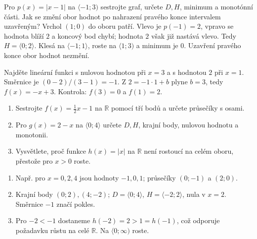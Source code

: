 \documentclass[11pt,a4paper]{article}
\begin{document}
\begin{zadaniReseniBox}
Pro $p(x)=|x-1|$ na $\langle-1;3)$ sestrojte graf, určete $D,H$, minimum a monotónní části. Jak se změní obor hodnot po nahrazení pravého konce intervalem uzavřeným?
\tcblower
Vrchol $(1;0)$ do oboru patří. Vlevo je $p(-1)=2$, vpravo se hodnota blíží $2$ a koncový bod chybí; hodnota $2$ však již nastává vlevo. Tedy $H=\langle0;2\rangle$. Klesá na $\langle-1;1\rangle$, roste na $\langle1;3)$ a minimum je $0$. Uzavření pravého konce obor hodnot nezmění.
\end{zadaniReseniBox}
\begin{zadaniReseniBox}
Najděte lineární funkci s nulovou hodnotou při $x=3$ a s hodnotou $2$ při $x=1$.
\tcblower
Směrnice je $(0-2)/(3-1)=-1$. Z $2=-1\cdot1+b$ plyne $b=3$, tedy $f(x)=-x+3$. Kontrola: $f(3)=0$ a $f(1)=2$.
\end{zadaniReseniBox}
\begin{zadaniReseniBox}
\begin{enumerate}[label=\alph*)]
\item Sestrojte $f(x)=\frac12x-1$ na $\mathbb R$ pomocí tří bodů a určete průsečíky s osami.
\item Pro $g(x)=2-x$ na $\langle0;4\rangle$ určete $D,H$, krajní body, nulovou hodnotu a monotonii.
\item Vysvětlete, proč funkce $h(x)=|x|$ na $\mathbb R$ není rostoucí na celém oboru, přestože pro $x>0$ roste.
\end{enumerate}
\tcblower
\begin{enumerate}[label=\alph*)]
\item Např. pro $x=0,2,4$ jsou hodnoty $-1,0,1$; průsečíky $(0;-1)$ a $(2;0)$.
\item Krajní body $(0;2),(4;-2)$; $D=\langle0;4\rangle$, $H=\langle-2;2\rangle$, nula v $x=2$. Směrnice $-1$ značí pokles.
\item Pro $-2<-1$ dostaneme $h(-2)=2>1=h(-1)$, což odporuje požadavku růstu na celé $\mathbb R$. Na $\langle0;\infty)$ roste.
\end{enumerate}
\end{zadaniReseniBox}
\end{document}
